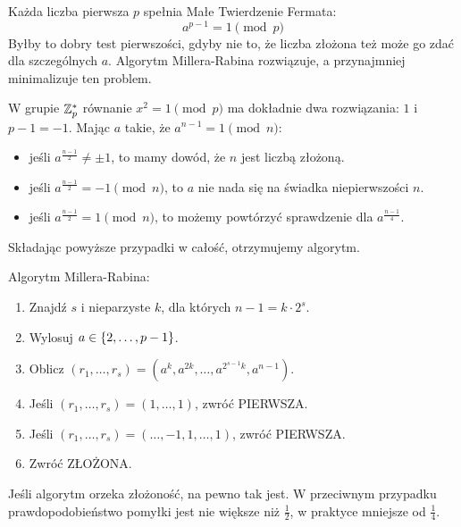 Każda liczba pierwsza \( p \) spełnia Małe Twierdzenie Fermata: \[ a^{p-1} = 1 \pmod{p} \] Byłby to dobry test pierwszości, gdyby nie to, że liczba złożona też może go zdać dla szczególnych \( a \). Algorytm Millera-Rabina rozwiązuje, a przynajmniej minimalizuje ten problem.

W grupie \( \mathbb{Z}_p^{*} \) równanie \( x^2 = 1 \pmod{p} \) ma dokładnie dwa rozwiązania: \( 1 \) i \( p - 1 = -1 \).
Mając \( a \) takie, że \( a^{n-1} = 1 \pmod{n} \):
\begin{itemize}
    \item jeśli \( a^{\frac{n-1}{2}} \neq \pm 1 \), to mamy dowód, że \( n \) jest liczbą złożoną.
    \item jeśli \( a^{\frac{n-1}{2}} = -1 \pmod{n} \), to \( a \) nie nada się na świadka niepierwszości \( n \).
    \item jeśli \( a^{\frac{n-1}{2}} = 1 \pmod{n} \), to możemy powtórzyć sprawdzenie dla \( a^{\frac{n-1}{4}}\).
\end{itemize}
Składając powyższe przypadki w całość, otrzymujemy algorytm.
\begin{greyframe}
    Algorytm Millera-Rabina:
    \begin{enumerate}
        \item Znajdź \( s \) i nieparzyste \( k \), dla których \( n-1 = k \cdot 2^s \).
        \item Wylosuj \( a \in \set{2, \dots, p - 1} \).
        \item Oblicz \( (r_1, \dots, r_s ) = (a^k, a^{2k}, \dots, a^{2^{s-1}k}, a^{n-1}) \).
        \item Jeśli \( (r_1, \dots, r_s) = (1, \dots, 1) \), zwróć PIERWSZA.
        \item Jeśli \( (r_1, \dots, r_s) = (\dots, -1, 1, \dots, 1) \), zwróć PIERWSZA.
        \item Zwróć ZŁOŻONA.
    \end{enumerate}
\end{greyframe}
Jeśli algorytm orzeka złożoność, na pewno tak jest. W przeciwnym przypadku prawdopodobieństwo pomyłki jest nie większe niż \( \frac{1}{2} \), w praktyce mniejsze od \( \frac{1}{4} \).

